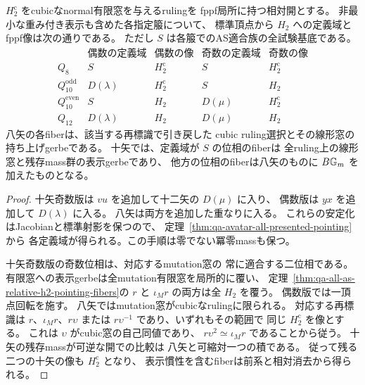 \begin{corollary}
\label{cor:qa-avatar-pointing-by-quiver}
$H_2^{\mathrm{c}}$ をcubicなnormal有限窓を与えるrulingを
fppf局所に持つ相対開とする。
非最小な重み付き表示も含めた各指定箙について、
標準頂点から $H_2$ への定義域とfppf像は次の通りである。
ただし $S$ は各箙でのAS適合族の全試験基底である。
\[
\begin{array}{c|cc|cc}
 &\text{偶数の定義域}&\text{偶数の像}
 &\text{奇数の定義域}&\text{奇数の像}\\ \hline
 Q_8 &S&H_2^{\mathrm{c}}&S&H_2^{\mathrm{c}}\\
 Q_{10}^{\mathrm{odd}}&D(\lambda)&H_2^{\mathrm{c}}&S&H_2\\
 Q_{10}^{\mathrm{even}}&S&H_2&D(\mu)&H_2^{\mathrm{c}}\\
 Q_{12}&D(\lambda)&H_2&D(\mu)&H_2
\end{array}
\]
八矢の各fiberは、該当する再標識で引き戻した
cubic ruling選択とその線形窓の持ち上げgerbeである。
十矢では、定義域が $S$ の位相のfiberは
全ruling上の線形窓と残存mass群の表示gerbeであり、
他方の位相のfiberは八矢のものに $B\mathbb G_m$ を加えたものとなる。
\end{corollary}
\begin{proof}
十矢奇数版は $vu$ を追加して十二矢の $D(\mu)$ に入り、
偶数版は $yx$ を追加して $D(\lambda)$ に入る。
八矢は両方を追加した重なりに入る。
これらの安定化はJacobianと標準射影を保つので、
定理~\ref{thm:qa-avatar-all-presented-pointing}から
各定義域が得られる。この手順は零でない冪零massも保つ。

十矢奇数版の奇数位相は、対応するmutation窓の
常に適合する二位相である。
有限窓への表示gerbeは全mutation有限窓を局所的に覆い、
定理~\ref{thm:qa-all-as-relative-h2-pointing-fibers}の
$r$ と $\iota_M r$ の両方は全 $H_2$ を覆う。
偶数版では一頂点回転を施す。
八矢ではmutation窓がcubicなrulingに限られる。
対応する再標識は $r$、$\iota_Mr$、$r\upsilon$ または
$r\upsilon^{-1}$ であり、いずれもその範囲で
同じ $H_2^{\mathrm{c}}$ を像とする。
これは $\upsilon$ がcubic窓の自己同値であり、
$r\upsilon^2\simeq\iota_Mr$ であることから従う。
十矢の残存massが可逆な開での比較は
八矢と可縮対一つの積である。
従って残る二つの十矢の像も $H_2^{\mathrm{c}}$ となり、
表示慣性を含むfiberは前系と相対消去から得られる。
\end{proof}

